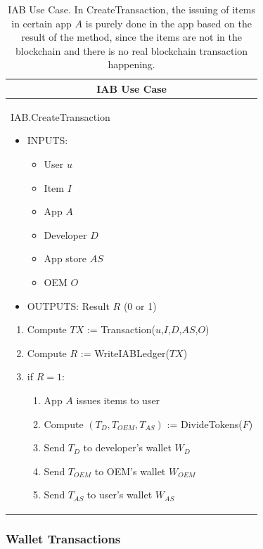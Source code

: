 \begin{table}[H]
\scriptsize
\centering
\begin{tabular}{|p{}|}
\hline
\multicolumn{1}{|c|}{IAB Use Case} \\
\hline \vspace{0.1cm}
\textsf{IAB.CreateTransaction}
\vspace{-0.3cm}
\begin{itemize}
	\item INPUTS:
	\vspace{-0.4cm}
	\begin{itemize}
		\item User $u$
		\item Item $I$
		\item App $A$
		\item Developer $D$
		\item App store $AS$
		\item OEM $O$
	\end{itemize}
	\item OUTPUTS: Result $R$ (0 or 1)
\end{itemize}
\begin{enumerate}
	\item Compute $TX$ := \textsf{Transaction}($u$,$I$,$D$,$AS$,$O$)
	\item Compute $R$ := \textsf{WriteIABLedger}($TX$)
	\item if $R = 1$:
	\begin{enumerate}
		\item App $A$ issues items to user
		\item Compute $(T_D, T_{OEM}, T_{AS})$ := \textsf{DivideTokens}($F$)
		\item Send $T_D$ to developer's wallet $W_D$
		\item Send $T_{OEM}$ to OEM's wallet $W_{OEM}$
		\item Send $T_{AS}$ to user's wallet $W_{AS}$
	\end{enumerate}
\end{enumerate} \\
\hline
\end{tabular}
\caption{IAB Use Case. In \textsf{CreateTransaction}, the issuing of items in certain app $A$ is purely done in the app based on the result of the method, since the items are not in the blockchain and there is no real blockchain transaction happening.}
\label{table: iab_protocol}
\end{table}


\subsubsection{Wallet Transactions}

